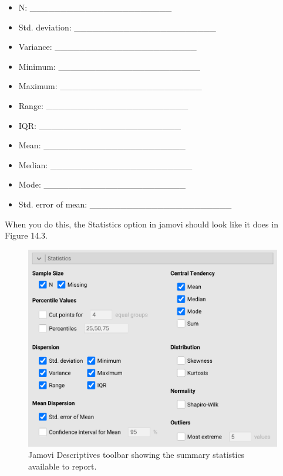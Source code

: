 \documentclass[
  openany]{krantz}
\providecommand{\tightlist}{%
  \setlength{\itemsep}{0pt}\setlength{\parskip}{0pt}}
\begin{document}
\begin{itemize}
\tightlist
\item
  N: \_\_\_\_\_\_\_\_\_\_\_\_\_\_\_\_\_\_\_\_\_\_\_
\item
  Std. deviation: \_\_\_\_\_\_\_\_\_\_\_\_\_\_\_\_\_\_\_\_\_\_\_
\item
  Variance: \_\_\_\_\_\_\_\_\_\_\_\_\_\_\_\_\_\_\_\_\_\_\_
\item
  Minimum: \_\_\_\_\_\_\_\_\_\_\_\_\_\_\_\_\_\_\_\_\_\_\_
\item
  Maximum: \_\_\_\_\_\_\_\_\_\_\_\_\_\_\_\_\_\_\_\_\_\_\_
\item
  Range: \_\_\_\_\_\_\_\_\_\_\_\_\_\_\_\_\_\_\_\_\_\_\_
\item
  IQR: \_\_\_\_\_\_\_\_\_\_\_\_\_\_\_\_\_\_\_\_\_\_\_
\item
  Mean: \_\_\_\_\_\_\_\_\_\_\_\_\_\_\_\_\_\_\_\_\_\_\_
\item
  Median: \_\_\_\_\_\_\_\_\_\_\_\_\_\_\_\_\_\_\_\_\_\_\_
\item
  Mode: \_\_\_\_\_\_\_\_\_\_\_\_\_\_\_\_\_\_\_\_\_\_\_
\item
  Std. error of mean: \_\_\_\_\_\_\_\_\_\_\_\_\_\_\_\_\_\_\_\_\_\_\_
\end{itemize}

When you do this, the Statistics option in jamovi should look like it does in Figure 14.3.

\begin{figure}
\includegraphics[width=1\linewidth]{img/lilypad_summary_statistics} \caption{Jamovi Descriptives toolbar showing the summary statistics available to report.}\label{fig:unnamed-chunk-48}
\end{figure}
\end{document}

